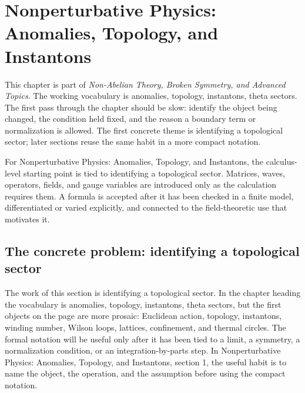 \chapter{Nonperturbative Physics: Anomalies, Topology, and Instantons}


This chapter is part of \emph{Non-Abelian Theory, Broken Symmetry, and Advanced Topics}.  The working vocabulary is anomalies, topology, instantons, theta sectors.  The first pass through the chapter should be slow: identify the object being changed, the condition held fixed, and the reason a boundary term or normalization is allowed.  The first concrete theme is identifying a topological sector; later sections reuse the same habit in a more compact notation.

For Nonperturbative Physics: Anomalies, Topology, and Instantons, the calculus-level starting point is tied to identifying a topological sector.  Matrices, waves, operators, fields, and gauge variables are introduced only as the calculation requires them.  A formula is accepted after it has been checked in a finite model, differentiated or varied explicitly, and connected to the field-theoretic use that motivates it.

\section{The concrete problem: identifying a topological sector}













The work of this section is identifying a topological sector.  In the chapter heading the vocabulary is anomalies, topology, instantons, theta sectors, but the first objects on the page are more prosaic: Euclidean action, topology, instantons, winding number, Wilson loops, lattices, confinement, and thermal circles.  The formal notation will be useful only after it has been tied to a limit, a symmetry, a normalization condition, or an integration-by-parts step.  In Nonperturbative Physics: Anomalies, Topology, and Instantons, section 1, the useful habit is to name the object, the operation, and the assumption before using the compact notation.

